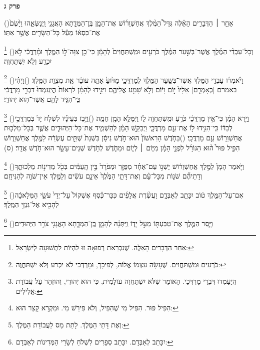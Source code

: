 \documentclass[12pt, openany]{book}
\newcommand{\sethebfont}{
\fontsize{10.5pt}{13.1pt} \selectfont
}
\newcommand{\twocol}[1]{
	{\sethebfont \begin{multicols}{2}
			#1
	\end{multicols}}	
}
\newcommand{\chapname}{}
\newcommand{\newchap}[1]{
	\addcontentsline{toc}{chapter}{#1}
	\renewcommand{\chapname}{#1}
		\begin{center}
			\textbf{%
\fontsize{16pt}{16pt}\selectfont
				#1}
		\end{center}
}
\newcommand{\footnotecomment}[1]{
	\renewcommand\thefootnote{}
	\footnote{#1}}
\newcommand{\commenta}[1]{\footnotecomment{#1}\hspace{0em}}
\newcommand{\vsnum}[1]{(\hebrewnumeral{#1})\space}
\begin{document}
\newchap{פרק ג}
\twocol{\vsnum{1}אַחַ֣ר ׀ הַדְּבָרִ֣ים הָאֵ֗לֶּה גִּדַּל֩ הַמֶּ֨לֶךְ אֲחַשְׁוֵר֜וֹשׁ אֶת־הָמָ֧ן בֶּֽן־הַמְּדָ֛תָא הָאֲגָגִ֖י וַֽיְנַשְּׂאֵ֑הוּ וַיָּ֙שֶׂם֙ אֶת־כִּסְא֔וֹ מֵעַ֕ל כָּל־הַשָּׂרִ֖ים אֲשֶׁ֥ר אִתּֽוֹ׃%
\commenta{אַחַר הַדְּבָרִים הָאֵלֶּה. שֶׁנִבְרֵאת רְפוּאָה זוּ לִהְיוֹת לִתְשׁוּעָה לְיִשְׂרָאֵל: }%
\vsnum{2}וְכָל־עַבְדֵ֨י הַמֶּ֜לֶךְ אֲשֶׁר־בְּשַׁ֣עַר הַמֶּ֗לֶךְ כֹּרְעִ֤ים וּמִֽשְׁתַּחֲוִים֙ לְהָמָ֔ן כִּי־כֵ֖ן צִוָּה־ל֣וֹ הַמֶּ֑לֶךְ וּמָ֨רְדֳּכַ֔י לֹ֥א יִכְרַ֖ע וְלֹ֥א יִֽשְׁתַּחֲוֶֽה׃%
\commenta{כֹּרְעִים וּמִשְׁתַּחֲוִים. שֶׁעָשָׂה עַצְמוֹ אֱלוֹהַּ, לְפִיכָךְ, וּמָרְדְּכַי לֹא יִכְרַע וְלֹא יִשְׁתַּחֲוֶה: }%
\vsnum{3}וַיֹּ֨אמְר֜וּ עַבְדֵ֥י הַמֶּ֛לֶךְ אֲשֶׁר־בְּשַׁ֥עַר הַמֶּ֖לֶךְ לְמָרְדֳּכָ֑י מַדּ֙וּעַ֙ אַתָּ֣ה עוֹבֵ֔ר אֵ֖ת מִצְוַ֥ת הַמֶּֽלֶךְ׃
\vsnum{4}וַיְהִ֗י באמרם [כְּאָמְרָ֤ם] אֵלָיו֙ י֣וֹם וָי֔וֹם וְלֹ֥א שָׁמַ֖ע אֲלֵיהֶ֑ם וַיַּגִּ֣ידוּ לְהָמָ֗ן לִרְאוֹת֙ הֲיַֽעַמְדוּ֙ דִּבְרֵ֣י מָרְדֳּכַ֔י כִּֽי־הִגִּ֥יד לָהֶ֖ם אֲשֶׁר־ה֥וּא יְהוּדִֽי׃%
\commenta{הֲיַעַמְדוּ דִּבְרֵי מָרְדְּכַי. הָאוֹמֵר שֶׁלֹּא יִשְׁתַּחֲוֶה עוֹלָמִית, כִּי הוּא יְהוּדִי, וְהוּזְהַר עַל עֲבוֹדַת אֱלִילִים: }%
\vsnum{5}וַיַּ֣רְא הָמָ֔ן כִּי־אֵ֣ין מָרְדֳּכַ֔י כֹּרֵ֥עַ וּמִֽשְׁתַּחֲוֶ֖ה ל֑וֹ וַיִּמָּלֵ֥א הָמָ֖ן חֵמָֽה׃
\vsnum{6}וַיִּ֣בֶז בְּעֵינָ֗יו לִשְׁלֹ֤ח יָד֙ בְּמָרְדֳּכַ֣י לְבַדּ֔וֹ כִּֽי־הִגִּ֥ידוּ ל֖וֹ אֶת־עַ֣ם מָרְדֳּכָ֑י וַיְבַקֵּ֣שׁ הָמָ֗ן לְהַשְׁמִ֧יד אֶת־כָּל־הַיְּהוּדִ֛ים אֲשֶׁ֛ר בְּכָל־מַלְכ֥וּת אֲחַשְׁוֵר֖וֹשׁ עַ֥ם מָרְדֳּכָֽי׃
\vsnum{7}בַּחֹ֤דֶשׁ הָרִאשׁוֹן֙ הוּא־חֹ֣דֶשׁ נִיסָ֔ן בִּשְׁנַת֙ שְׁתֵּ֣ים עֶשְׂרֵ֔ה לַמֶּ֖לֶךְ אֲחַשְׁוֵר֑וֹשׁ הִפִּ֣יל פּוּר֩ ה֨וּא הַגּוֹרָ֜ל לִפְנֵ֣י הָמָ֗ן מִיּ֧וֹם ׀ לְי֛וֹם וּמֵחֹ֛דֶשׁ לְחֹ֥דֶשׁ שְׁנֵים־עָשָׂ֖ר הוּא־חֹ֥דֶשׁ אֲדָֽר׃ (ס)%
\commenta{הִפִּיל פּוּר. הִפִּיל מִי שֶׁהִפִּיל, וְלֹא פִּירֵשׁ מִי. וּמִקְרָא קָצֵר הוּא: }%
\vsnum{8}וַיֹּ֤אמֶר הָמָן֙ לַמֶּ֣לֶךְ אֲחַשְׁוֵר֔וֹשׁ יֶשְׁנ֣וֹ עַם־אֶחָ֗ד מְפֻזָּ֤ר וּמְפֹרָד֙ בֵּ֣ין הָֽעַמִּ֔ים בְּכֹ֖ל מְדִינ֣וֹת מַלְכוּתֶ֑ךָ וְדָתֵיהֶ֞ם שֹׁנ֣וֹת מִכָּל־עָ֗ם וְאֶת־דָּתֵ֤י הַמֶּ֙לֶךְ֙ אֵינָ֣ם עֹשִׂ֔ים וְלַמֶּ֥לֶךְ אֵין־שֹׁוֶ֖ה לְהַנִּיחָֽם׃%
\commenta{וְאֶת דָּתֵי הַמֶּלֶךְ. לָתֵת מַס לַעֲבוֹדַת הַמֶּלֶךְ:}%
\vsnum{9}אִם־עַל־הַמֶּ֣לֶךְ ט֔וֹב יִכָּתֵ֖ב לְאַבְּדָ֑ם וַעֲשֶׂ֨רֶת אֲלָפִ֜ים כִּכַּר־כֶּ֗סֶף אֶשְׁקוֹל֙ עַל־יְדֵי֙ עֹשֵׂ֣י הַמְּלָאכָ֔ה לְהָבִ֖יא אֶל־גִּנְזֵ֥י הַמֶּֽלֶךְ׃%
\commenta{יִכָּתֵב לְאַבְּדָם. יִכָּתֵב סְפָרִים לִשְׁלֹחַ לְשָׂרֵי הַמְּדִינוֹת לְאַבְּדָם:}%
\vsnum{10}וַיָּ֧סַר הַמֶּ֛לֶךְ אֶת־טַבַּעְתּ֖וֹ מֵעַ֣ל יָד֑וֹ וַֽיִּתְּנָ֗הּ לְהָמָ֧ן בֶּֽן־הַמְּדָ֛תָא הָאֲגָגִ֖י צֹרֵ֥ר הַיְּהוּדִֽים׃%
}
\end{document}
